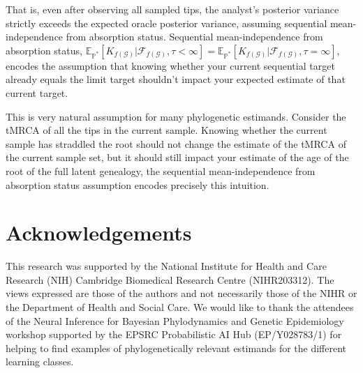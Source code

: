 \documentclass{article}
\begin{document}
That is, even after observing all sampled tips, the analyst's posterior variance strictly exceeds the expected oracle posterior variance, assuming sequential mean-independence from absorption status. Sequential mean-independence from absorption status, $\mathbb{E}_{\mathbb{P}^*}[K_{f(\mathcal{G})}|\mathcal{F}_{f(\mathcal{G})}, \tau<\infty]=\mathbb{E}_{\mathbb{P}^*}[K_{f(\mathcal{G})}|\mathcal{F}_{f(\mathcal{G})}, \tau=\infty]$, encodes the assumption that knowing whether your current sequential target already equals the limit target shouldn't impact your expected estimate of that current target. 

This is very natural assumption for many phylogenetic estimands. Consider the tMRCA of all the tips in the current sample. Knowing whether the current sample has straddled the root should not change the estimate of the tMRCA of the current sample set, but it should still impact your estimate of the age of the root of the full latent genealogy, the sequential mean-independence from absorption status assumption encodes precisely this intuition.

\section{Acknowledgements}
This research was supported by the National Institute for Health and Care Research (NIH) Cambridge Biomedical Research Centre (NIHR203312). The views expressed are those of the authors and not necessarily those of the NIHR or the Department of Health and Social Care. We would like to thank the attendees of the Neural Inference for Bayesian Phylodynamics and Genetic Epidemiology workshop supported by the EPSRC Probabilistic AI Hub (EP/Y028783/1) for helping to find examples of phylogenetically relevant estimands for the different learning classes.
\end{document}
